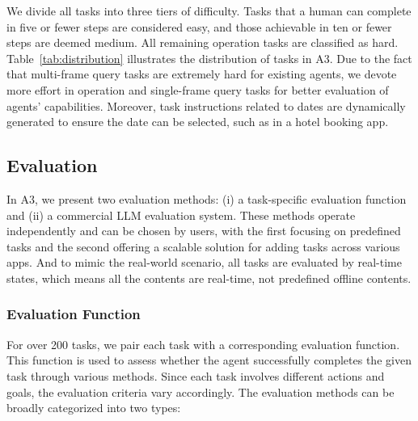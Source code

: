 \documentclass[11pt]{article}
\begin{document}
We divide all tasks into three tiers of difficulty. Tasks that a human can complete in five or fewer steps are considered easy, and those achievable in ten or fewer steps are deemed medium. All remaining operation tasks are classified as hard. Table~\ref{tab:distribution} illustrates the distribution of tasks in A3. Due to the fact that multi-frame query tasks are extremely hard for existing agents, we devote more effort in operation and single-frame query tasks for better evaluation of agents' capabilities. Moreover, task instructions related to dates are dynamically generated to ensure the date can be selected, such as in a hotel booking app.


\subsection{Evaluation}

In A3, we present two evaluation methods: (i) a task-specific evaluation function and (ii) a commercial LLM evaluation system. These methods operate independently and can be chosen by users, with the first focusing on predefined tasks and the second offering a scalable solution for adding tasks across various apps. And to mimic the real-world scenario, all tasks are evaluated by real-time states, which means all the contents are real-time, not predefined offline contents.

\subsubsection{Evaluation Function}
\label{sec:func-eval}

For over 200 tasks, we pair each task with a corresponding evaluation function. This function is used to assess whether the agent successfully completes the given task through various methods. Since each task involves different actions and goals, the evaluation criteria vary accordingly. The evaluation methods can be broadly categorized into two types:
\end{document}
